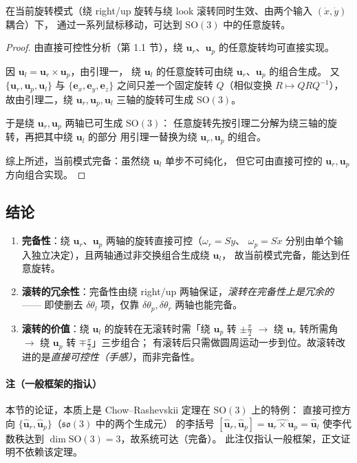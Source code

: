 \begin{theorem}[当前耦合模式完备]
  在当前旋转模式（绕 right/up 旋转与绕 look 滚转同时生效、由两个输入 $(\dot x,\dot y)$ 耦合）下，
  通过一系列鼠标移动，可达到 $\mathrm{SO}(3)$ 中的任意旋转。
\end{theorem}

\begin{proof}
  由直接可控性分析（第 1.1 节），绕 $\mathbf{u}_r$、$\mathbf{u}_p$
  的任意旋转均可直接实现。

  因 $\mathbf{u}_l = \mathbf{u}_r\times\mathbf{u}_p$，由引理一，
  绕 $\mathbf{u}_l$ 的任意旋转可由绕 $\mathbf{u}_r$、$\mathbf{u}_p$ 的组合生成。
  又 $\{\mathbf{u}_r,\mathbf{u}_p,\mathbf{u}_l\}$ 与 $\{\mathbf{e}_x,\mathbf{e}_y,\mathbf{e}_z\}$
  之间只差一个固定旋转 $Q$（相似变换 $R\mapsto Q R Q^{-1}$），
  故由引理二，绕 $\mathbf{u}_r,\mathbf{u}_p,\mathbf{u}_l$ 三轴的旋转可生成 $\mathrm{SO}(3)$。

  于是绕 $\mathbf{u}_r,\mathbf{u}_p$ 两轴已可生成 $\mathrm{SO}(3)$：
  任意旋转先按引理二分解为绕三轴的旋转，再把其中绕 $\mathbf{u}_l$ 的部分
  用引理一替换为绕 $\mathbf{u}_r,\mathbf{u}_p$ 的组合。

  综上所述，当前模式完备：虽然绕 $\mathbf{u}_l$ 单步不可纯化，
  但它可由直接可控的 $\mathbf{u}_r,\mathbf{u}_p$ 方向组合实现。\qedhere
\end{proof}

\subsection{结论}

\begin{enumerate}
  \item \textbf{完备性}：绕 $\mathbf{u}_r$、$\mathbf{u}_p$ 两轴的旋转直接可控（$\omega_r=S\dot y$、
    $\omega_p=S\dot x$ 分别由单个输入独立决定），且两轴通过非交换组合生成绕 $\mathbf{u}_l$，
    故当前模式完备，能达到任意旋转。

  \item \textbf{滚转的冗余性}：完备性由绕 right/up 两轴保证，\emph{滚转在完备性上是冗余的}——
    即使删去 $\delta\theta_l$ 项，仅靠 $\delta\theta_p,\delta\theta_r$ 两轴也能完备。

  \item \textbf{滚转的价值}：绕 $\mathbf{u}_l$ 的旋转在无滚转时需「绕 $\mathbf{u}_p$ 转 $\pm\tfrac{\pi}{2}$
    $\to$ 绕 $\mathbf{u}_r$ 转所需角 $\to$ 绕 $\mathbf{u}_p$ 转 $\mp\tfrac{\pi}{2}$」三步组合；
    有滚转后只需做圆周运动一步到位。故滚转改进的是\emph{直接可控性（手感）}，而非完备性。
\end{enumerate}

\paragraph{注（一般框架的指认）}
本节的论证，本质上是 Chow--Rashevskii 定理在 $\mathrm{SO}(3)$ 上的特例：
直接可控方向 $\{\hat{\mathbf{u}}_r,\hat{\mathbf{u}}_p\}$（$\mathfrak{so}(3)$ 中的两个生成元）
的李括号 $[\hat{\mathbf{u}}_r,\hat{\mathbf{u}}_p]=\widehat{\mathbf{u}_r\times\mathbf{u}_p}
=\hat{\mathbf{u}}_l$ 使李代数秩达到 $\dim\mathrm{SO}(3)=3$，故系统可达（完备）。
此注仅指认一般框架，正文证明不依赖该定理。
